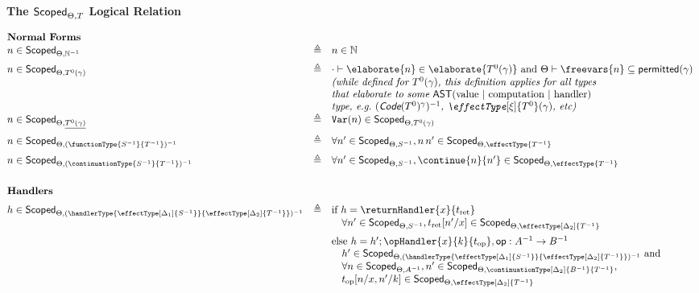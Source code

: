\begin{figure}
\begin{rec-desc}
  {\large\textbf{The $\textsf{Scoped}_{{\Theta}, {T}}$ Logical Relation}}
  \vspace{5mm}

  $
  \begin{array}{@{}lllr}
    \textbf{Normal Forms} \\\vspace{2mm}
    n \in \scoped{\mathbb{N}^{-1}} & \triangleq & n \in \mathbb{N} \\ 
    n \in \scoped{{T}^{0}(\gamma)} & \triangleq & \cdot \vdash \elaborate{n} \in \elaborate{T^{0} (\gamma)} \text{ and } \Theta \vdash \freevars{n} \subseteq \textsf{permitted}(\gamma) \\
    && \textit{(while defined for $T^{0} {(\gamma)}$, this definition applies for all types}\\
    && \textit{that elaborate to some} \text{ {\textsf{AST}}$($value $\mid$ computation $\mid$ handler$)$} \\ 
    && \textit{type, e.g.\ $(\textsf{Code}(T^0)^{\gamma})^{-1}$, $\effectType[\xi]{T^{0}} (\gamma)$, etc) }\\\vspace{2mm}
    n \in \scoped{\underline{{T}^{0}(\gamma)}} & \triangleq & \texttt{Var}({n}) \in \scoped{{T^{0}} (\gamma)} \\ \vspace{2mm}
    n \in \scoped{(\functionType{{S}^{-1}}{{T}^{-1}})^{-1}} & \triangleq & \forall n' \in \scoped{{S}^{-1}}, n \, n' \in \scoped{\effectType{T^{-1}}} \\ \vspace{2mm}
    n \in \scoped{(\continuationType{{S}^{-1}}{{T}^{-1}})^{-1}} & \triangleq & \forall n' \in \scoped{{S}^{-1}}, \continue{n}{n'} \in \scoped{\effectType{T^{-1}}} \\\\ \vspace{2mm}
    \textbf{Handlers} \\
    h \in \scoped{(\handlerType{\effectType[\Delta_1]{{S}^{-1}}}{\effectType[\Delta_2]{{T}^{-1}}})^{-1}} & \triangleq & \text{if } h = \returnHandler{x}{t_{\text{ret}}}\\ \vspace{2mm}
    && \quad \forall n' \in \scoped{{S}^{-1}}, t_{\text{ret}}[n'/x] \in \scoped{\effectType[\Delta_2]{T^{-1}}} \\
    && \text{else } h = h'; \opHandler{x}{k}{t_{\text{op}}}, \textsf{op}: A^{-1} \to B^{-1} \\
    && \quad h' \in \scoped{(\handlerType{\effectType[\Delta_1]{{S}^{-1}}}{\effectType[\Delta_2]{{T}^{-1}}})^{-1}} \text{ and}\\ 
    && \quad \forall n \in \scoped{{A}^{-1}}, n' \in \scoped{\continuationType[\Delta_2]{{B}^{-1}}{T^{-1}}}, \\ && \quad t_{\text{op}}[n/x, n'/k] \in \scoped{\effectType[\Delta_2]{T^{-1}}}\\\\
  \end{array}
$


\end{rec-desc}
\end{figure}
